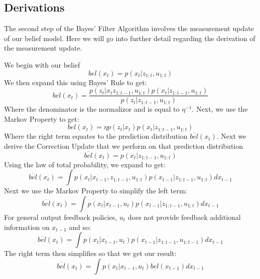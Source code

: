 \documentclass[twoside]{article}
\begin{document}
\subsection{Derivations}
The second step of the Bayes' Filter Algorithm involves the measurement update of our belief model. Here we will go into further detail regarding the derivation of the measurement update.

We begin with our belief
\begin{equation*}
    bel(x_{t}) = p(x_{t}|z_{1:t},u_{1:t})
\end{equation*}
We then expand this using Bayes' Rule to get:
\begin{equation*}
    bel(x_{t}) =\frac{p(z_{t}|x_{t}z_{1:t-1},u_{1:t})p(x_{t}|z_{1:t-1},u_{1:t})}{p(z_{t}|z_{1:t-1},u_{1:t})} 
\end{equation*}
Where the denominator is the normalizor and is equal to $\eta^{-1}$. Next, we use the Markov Property to get:
\begin{equation*}
    bel(x_{t}) = \eta p(z_{t}|x_{t})p(x_{t}|z_{1:t-1},u_{1:t})
\end{equation*}
Where the right term equates to the prediction distribution $\overline{bel}(x_{t})$.
Next we derive the Correction Update that we perform on that prediction distribution
\begin{equation*}
    \overline{bel}(x_{t}) = p(x_{t}|z_{1:t-1},u_{1:t})
\end{equation*}
Using the law of total probability, we expand to get:
\begin{equation*}
    \overline{bel}(x_{t}) = \int p(x_{t}|x_{t-1},z_{1:t-1},u_{1:t})p(x_{t-1}|z_{1:t-1},u_{1:t})dx_{t-1}
\end{equation*}
Next we use the Markov Property to simplify the left term:
\begin{equation*}
    \overline{bel}(x_{t}) = \int p(x_{t}|x_{t-1},u_{t})p(x_{t-1}|z_{1:t-1},u_{1:t})dx_{t-1}
\end{equation*}
For general output feedback policies, $u_{t}$ does not provide feedback additional information on $x_{t-1}$ and so:
\begin{equation*}
    \overline{bel}(x_{t}) = \int p(x_{t}|x_{t-1},u_{t})p(x_{t-1}|z_{1:t-1},u_{1:t-1})dx_{t-1}
\end{equation*}
The right term then simplifies so that we get our result:
\begin{equation*}
    \overline{bel}(x_{t}) = \int p(x_{t}|x_{t-1},u_{t})bel(x_{t-1})dx_{t-1}
\end{equation*}
\end{document}
